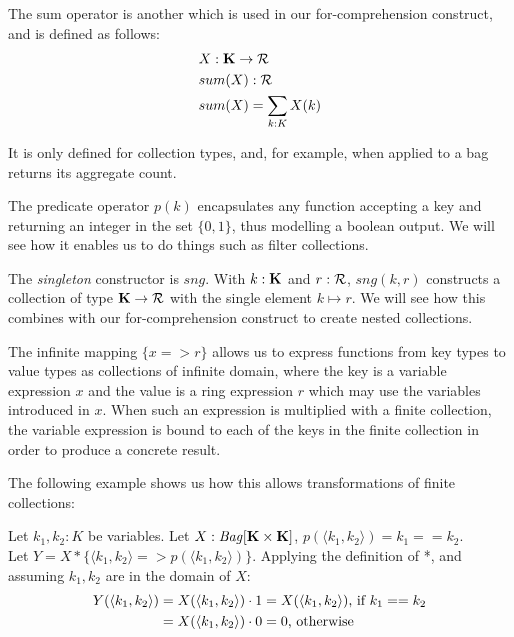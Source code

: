 {{{The sum operator is another which is used in our for-comprehension construct, and is defined as follows: 
\begin{equation*}
\begin{split}
 & X: \mathbf{K} \rightarrow \mathcal{R} \\
 & sum(X): \mathcal{R} \\
 & sum(X) = \sum_{k: K} X(k)
\end{split}
\end{equation*}
 
It is only defined for collection types, and, for example, when applied to a bag returns its aggregate count.
 
The predicate operator $p(k)$ encapsulates any function accepting a key and returning an integer in the set $\{0,1\}$, thus modelling a boolean output. We will see how it enables us to do things such as filter collections.
 
The \textit{singleton} constructor is $sng$. With $k: \mathbf{K}$ and $r: \mathcal{R}$, $sng(k,r)$ constructs a collection of type $\mathbf{K} \rightarrow \mathcal{R}$ with the single element $k  \mapsto r$. We will see how this combines with our for-comprehension construct to create nested collections.
 
The infinite mapping $\{x => r\}$ allows us to express functions from key types to value types as collections of infinite domain, where the key is a variable expression $x$ and the value is a ring expression $r$ which may use the variables introduced in $x$. When such an expression is multiplied with a finite collection, the variable expression is bound to each of the keys in the finite collection in order to produce a concrete result.

The following example shows us how this allows transformations of finite collections:

Let $k_1,k_2: K$ be variables. Let $X: \textrm{\textit{Bag}}[\mathbf{K} \times \mathbf{K}]$, $p(\langle k_1, k_2 \rangle) = k_1 == k_2$. \\
Let $Y = X * \{\langle k_1, k_2 \rangle => p(\langle k_1, k_2 \rangle)\}$. Applying the definition of *, and assuming $k_1,k_2$ are in the domain of $X$: \\
\begin{equation*}
\begin{split}
Y(\langle k_1, k_2 \rangle) &= X(\langle k_1, k_2 \rangle) \cdot 1 = X(\langle k_1, k_2 \rangle)\textrm{, if } k_1 == k_2 \\
&= X(\langle k_1, k_2 \rangle) \cdot 0 = 0\textrm{, otherwise}
\end{split}
\end{equation*}

}}}
